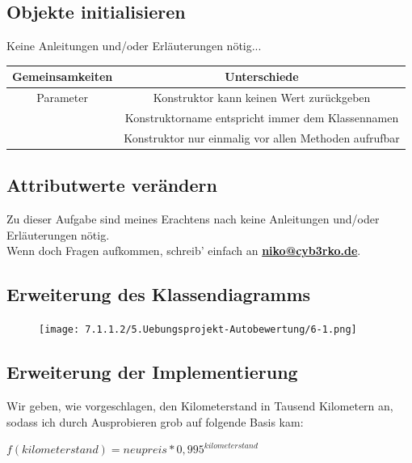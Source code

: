 \documentclass{scrartcl}   %
\begin{document}
\subsection{Objekte initialisieren}

\begin{itemize}
    \barrow Keine Anleitungen und/oder Erläuterungen nötig...
    \barrow \vspace{15pt}
    \begin{tabular}[ht]{c|c}
\\\textbf{Gemeinsamkeiten} & \textbf{Unterschiede}\\
\hline
Parameter & Konstruktor kann keinen Wert zurückgeben\\
\hline
& Konstruktorname entspricht immer dem Klassennamen\\
\hline
& Konstruktor nur einmalig vor allen Methoden aufrufbar\\
\end{tabular}
\end{itemize}

\subsection{Attributwerte verändern}

Zu dieser Aufgabe sind meines Erachtens nach keine Anleitungen und/oder Erläuterungen nötig.\\
Wenn doch Fragen aufkommen, schreib' einfach an \textbf{\href{mailto:niko@cyb3rko.de}{niko@cyb3rko.de}}.

\subsection{Erweiterung des Klassendiagramms}
\label{klassendiagramm}

\begin{figure}[ht]
	\centering
	\texttt{[image: 7.1.1.2/5.Uebungsprojekt-Autobewertung/6-1.png]}
\end{figure}

\subsection{Erweiterung der Implementierung}

Wir geben, wie vorgeschlagen, den Kilometerstand in \glqq Tausend Kilometern\grqq{} an, sodass ich durch Ausprobieren grob auf folgende Basis kam:

\begin{center}
    \texttt{$f(kilometerstand) = neupreis * 0,995^{kilometerstand}$}
\end{center}
\end{document}
